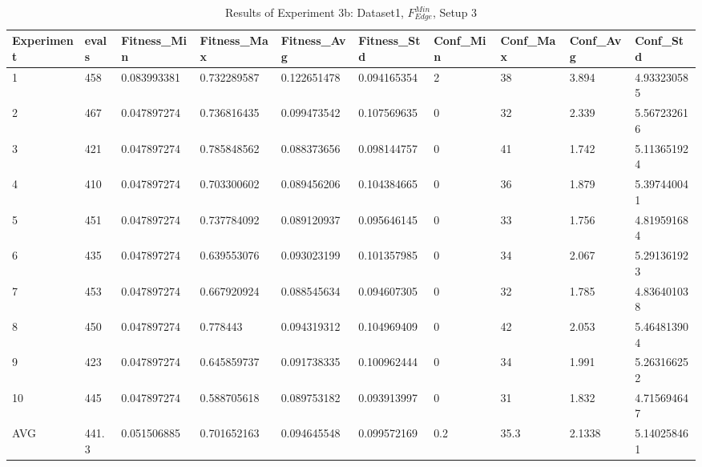 		\begin{table}[H]
			\caption{Results of Experiment 3b: Dataset1, $F_{Edge}^{Min}$, Setup 3}
			\label{tab:A_Exp3b_Data}
			\begin{adjustbox}{max width=360pt,keepaspectratio,angle=90}
				\begin{tabular}{|l|l|l|l|l|l|l|l|l|l|}
					\hline
					\rowcolor[HTML]{EFEFEF} 
					Experiment & evals & Fitness\_Min & Fitness\_Max & Fitness\_Avg & Fitness\_Std & Conf\_Min & Conf\_Max & Conf\_Avg & Conf\_Std   \\ \hline
					1          & 458   & 0.083993381  & 0.732289587  & 0.122651478  & 0.094165354  & 2         & 38        & 3.894     & 4.933230585 \\ \hline
					2          & 467   & 0.047897274  & 0.736816435  & 0.099473542  & 0.107569635  & 0         & 32        & 2.339     & 5.567232616 \\ \hline
					3          & 421   & 0.047897274  & 0.785848562  & 0.088373656  & 0.098144757  & 0         & 41        & 1.742     & 5.113651924 \\ \hline
					4          & 410   & 0.047897274  & 0.703300602  & 0.089456206  & 0.104384665  & 0         & 36        & 1.879     & 5.397440041 \\ \hline
					5          & 451   & 0.047897274  & 0.737784092  & 0.089120937  & 0.095646145  & 0         & 33        & 1.756     & 4.819591684 \\ \hline
					6          & 435   & 0.047897274  & 0.639553076  & 0.093023199  & 0.101357985  & 0         & 34        & 2.067     & 5.291361923 \\ \hline
					7          & 453   & 0.047897274  & 0.667920924  & 0.088545634  & 0.094607305  & 0         & 32        & 1.785     & 4.836401038 \\ \hline
					8          & 450   & 0.047897274  & 0.778443     & 0.094319312  & 0.104969409  & 0         & 42        & 2.053     & 5.464813904 \\ \hline
					9          & 423   & 0.047897274  & 0.645859737  & 0.091738335  & 0.100962444  & 0         & 34        & 1.991     & 5.263166252 \\ \hline
					10         & 445   & 0.047897274  & 0.588705618  & 0.089753182  & 0.093913997  & 0         & 31        & 1.832     & 4.715694647 \\ \hline
					AVG        & 441.3 & 0.051506885  & 0.701652163  & 0.094645548  & 0.099572169  & 0.2       & 35.3      & 2.1338    & 5.140258461 \\ \hline
				\end{tabular}

\end{adjustbox}
\end{table}
